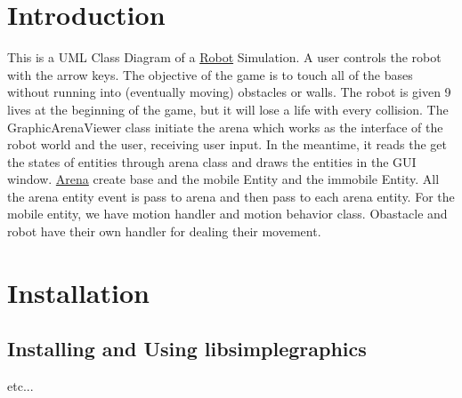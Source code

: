 \hypertarget{index_intro_sec}{}\section{Introduction}\label{index_intro_sec}
This is a U\+ML Class Diagram of a \hyperlink{classRobot}{Robot} Simulation. A user controls the robot with the arrow keys. The objective of the game is to touch all of the bases without running into (eventually moving) obstacles or walls. The robot is given 9 lives at the beginning of the game, but it will lose a life with every collision. The Graphic\+Arena\+Viewer class initiate the arena which works as the interface of the robot world and the user, receiving user input. In the meantime, it reads the get the states of entities through arena class and draws the entities in the G\+UI window. \hyperlink{classArena}{Arena} create base and the mobile Entity and the immobile Entity. All the arena entity event is pass to arena and then pass to each arena entity. For the mobile entity, we have motion handler and motion behavior class. Obastacle and robot have their own handler for dealing their movement.\hypertarget{index_install_sec}{}\section{Installation}\label{index_install_sec}
\hypertarget{index_libsimplegraphics}{}\subsection{Installing and Using libsimplegraphics}\label{index_libsimplegraphics}
etc... 